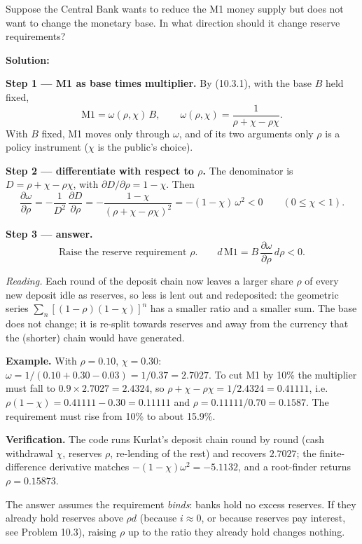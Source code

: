 \documentclass[12pt, letterpaper]{article}
\newcommand{\pd}[2]{\dfrac{\partial #1}{\partial #2}}
\begin{document}
\begin{tcolorbox}[oddbox,title={Problem 10.1 \quad Central Bank Instruments}]
\begin{tcolorbox}[questionbox]
Suppose the Central Bank wants to reduce the M1 money supply but does not want to change the
monetary base. In what direction should it change reserve requirements?
\end{tcolorbox}

\textbf{Solution:}

\textbf{Step 1 --- M1 as base times multiplier.} By (10.3.1), with the base $B$ held fixed,
\[
\text{M1}=\omega(\rho,\chi)\,B,\qquad \omega(\rho,\chi)=\frac{1}{\rho+\chi-\rho\chi}.
\]
With $B$ fixed, M1 moves only through $\omega$, and of its two arguments only $\rho$ is a
policy instrument ($\chi$ is the public's choice).

\textbf{Step 2 --- differentiate with respect to $\rho$.} The denominator is
$D=\rho+\chi-\rho\chi$, with $\partial D/\partial\rho=1-\chi$. Then
\[
\pd{\omega}{\rho}=-\frac{1}{D^{2}}\,\pd{D}{\rho}=-\frac{1-\chi}{(\rho+\chi-\rho\chi)^{2}}
=-(1-\chi)\,\omega^{2}<0\qquad(0\le\chi<1).
\]

\textbf{Step 3 --- answer.}
\[
\boxed{\text{Raise the reserve requirement }\rho.}\qquad
d\,\text{M1}=B\,\pd{\omega}{\rho}\,d\rho<0 .
\]

\emph{Reading.} Each round of the deposit chain now leaves a larger share $\rho$ of every new
deposit idle as reserves, so less is lent out and redeposited: the geometric series
$\sum_n[(1-\rho)(1-\chi)]^n$ has a smaller ratio and a smaller sum. The base does not change;
it is re-split towards reserves and away from the currency that the (shorter) chain would
have generated.

\smallskip
\textbf{Example.} With $\rho=0.10$, $\chi=0.30$: $\omega=1/(0.10+0.30-0.03)=1/0.37=2.7027$.
To cut M1 by 10\% the multiplier must fall to $0.9\times2.7027=2.4324$, so
$\rho+\chi-\rho\chi=1/2.4324=0.41111$, i.e.\ $\rho(1-\chi)=0.41111-0.30=0.11111$ and
$\rho=0.11111/0.70=\mathbf{0.1587}$. The requirement must rise from 10\% to about 15.9\%.

\smallskip
\textbf{Verification.} The code runs Kurlat's deposit chain round by round (cash
withdrawal $\chi$, reserves $\rho$, re-lending of the rest) and recovers $2.7027$; the
finite-difference derivative matches $-(1-\chi)\omega^2=-5.1132$, and a root-finder
returns $\rho=0.15873$. \checkmark

\begin{tcolorbox}[trapbox]
\small
The answer assumes the requirement \emph{binds}: banks hold no excess reserves. If they
already hold reserves above $\rho d$ (because $i\approx0$, or because reserves pay interest,
see Problem 10.3), raising $\rho$ up to the ratio they already hold changes nothing.
\end{tcolorbox}
\end{tcolorbox}
\end{document}
